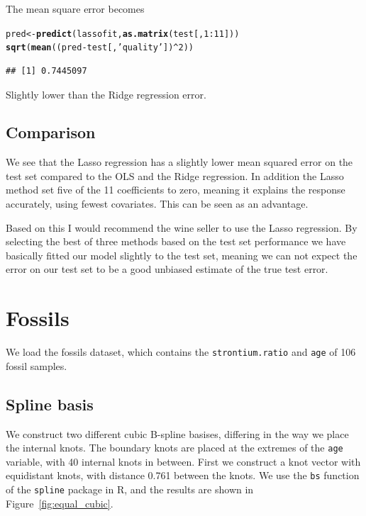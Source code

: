 \documentclass[a4paper]{article}\usepackage[]{graphicx}\usepackage[]{color}
\makeatletter
\newcommand{\hlnum}[1]{\textcolor[rgb]{0.686,0.059,0.569}{#1}}%
\newcommand{\hlstr}[1]{\textcolor[rgb]{0.192,0.494,0.8}{#1}}%
\newcommand{\hlopt}[1]{\textcolor[rgb]{0,0,0}{#1}}%
\newcommand{\hlstd}[1]{\textcolor[rgb]{0.345,0.345,0.345}{#1}}%
\newcommand{\hlkwb}[1]{\textcolor[rgb]{0.69,0.353,0.396}{#1}}%
\newcommand{\hlkwd}[1]{\textcolor[rgb]{0.737,0.353,0.396}{\textbf{#1}}}%
\newenvironment{kframe}{%
 \def\at@end@of@kframe{}%
 \ifinner\ifhmode%
  \def\at@end@of@kframe{\end{minipage}}%
  \begin{minipage}{\columnwidth}%
 \fi\fi%
 \def\FrameCommand##1{\hskip\@totalleftmargin \hskip-\fboxsep
 \colorbox{shadecolor}{##1}\hskip-\fboxsep
     \hskip-\linewidth \hskip-\@totalleftmargin \hskip\columnwidth}%
 \MakeFramed {\advance\hsize-\width
   \@totalleftmargin\z@ \linewidth\hsize
   \@setminipage}}%
 {\par\unskip\endMakeFramed%
 \at@end@of@kframe}
\newenvironment{knitrout}{}{} %
\makeatother
\begin{document}
The mean square error becomes
\begin{knitrout}
\color{fgcolor}\begin{kframe}
\begin{alltt}
\hlstd{pred} \hlkwb{<-} \hlkwd{predict}\hlstd{(lassofit,} \hlkwd{as.matrix}\hlstd{(test[,}\hlnum{1}\hlopt{:}\hlnum{11}\hlstd{]))}
\hlkwd{sqrt}\hlstd{(}\hlkwd{mean}\hlstd{((pred} \hlopt{-} \hlstd{test[,}\hlstr{'quality'}\hlstd{])}\hlopt{^}\hlnum{2}\hlstd{))}
\end{alltt}
\begin{verbatim}
## [1] 0.7445097
\end{verbatim}
\end{kframe}
\end{knitrout}
Slightly lower than the Ridge regression error.

\subsection{Comparison}

We see that the Lasso regression has a slightly lower mean squared error on the test set compared to the OLS and the Ridge regression. In addition the Lasso method set five of the 11 coefficients to zero, meaning it explains the response accurately, using fewest covariates. This can be seen as an advantage.

Based on this I would recommend the wine seller to use the Lasso regression. By selecting the best of three methods based on the test set performance we have basically fitted our model slightly to the test set, meaning we can not expect the error on our test set to be a good unbiased estimate of the true test error.

\section{Fossils}

We load the fossils dataset, which contains the
\texttt{strontium.ratio} and
\texttt{age}
of 106 fossil samples. 


\subsection{Spline basis}

We construct two different cubic B-spline basises, differing in the way we place the internal knots. The boundary knots are placed at the extremes of the \texttt{age} variable, with 40 internal knots in between. First we construct a knot vector with equidistant knots, with distance 0.761 between the knots. We use the \texttt{bs} function of the \texttt{spline} package in R, and the results are shown in Figure~\ref{fig:equal_cubic}.
\end{document}
